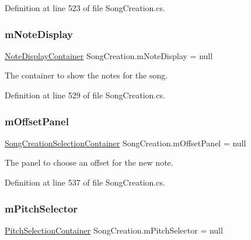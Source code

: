 Definition at line 523 of file Song\+Creation.\+cs.

\mbox{\label{group___s_c_priv_var_ga19cefeb7077126193c7f60d07dfdf32c}} 
\subsubsection{\texorpdfstring{m\+Note\+Display}{mNoteDisplay}}
{\footnotesize\ttfamily \hyperlink{class_note_display_container}{Note\+Display\+Container} Song\+Creation.\+m\+Note\+Display = null\hspace{0.3cm}{\ttfamily [private]}}



The container to show the notes for the song. 



Definition at line 529 of file Song\+Creation.\+cs.

\mbox{\label{group___s_c_priv_var_gafeeda8ab122f574c6fff94814234334c}} 
\subsubsection{\texorpdfstring{m\+Offset\+Panel}{mOffsetPanel}}
{\footnotesize\ttfamily \hyperlink{class_song_creation_1_1_song_creation_selection_container}{Song\+Creation\+Selection\+Container} Song\+Creation.\+m\+Offset\+Panel = null\hspace{0.3cm}{\ttfamily [private]}}



The panel to choose an offset for the new note. 



Definition at line 537 of file Song\+Creation.\+cs.

\mbox{\label{group___s_c_priv_var_gac32e68713b2b504807f52acef445df1c}} 
\subsubsection{\texorpdfstring{m\+Pitch\+Selector}{mPitchSelector}}
{\footnotesize\ttfamily \hyperlink{class_song_creation_1_1_pitch_selection_container}{Pitch\+Selection\+Container} Song\+Creation.\+m\+Pitch\+Selector = null\hspace{0.3cm}{\ttfamily [private]}}



